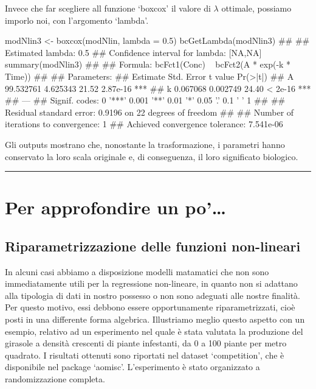 \documentclass[a4paper,12pt,oneside]{book}
\newenvironment{Shaded}{}{}
\newcommand{\KeywordTok}[1]{#1}
\newcommand{\DataTypeTok}[1]{#1}
\newcommand{\FloatTok}[1]{#1}
\newcommand{\StringTok}[1]{#1}
\newcommand{\CommentTok}[1]{#1}
\newcommand{\NormalTok}[1]{#1}
\begin{document}
Invece che far scegliere all funzione `boxcox' il valore di \(\lambda\) ottimale, possiamo imporlo noi, con l'argomento `lambda'.

\begin{Shaded}
\begin{Highlighting}[]
\NormalTok{modNlin3 <-}\StringTok{ }\KeywordTok{boxcox}\NormalTok{(modNlin, }\DataTypeTok{lambda =} \FloatTok{0.5}\NormalTok{)}
\KeywordTok{bcGetLambda}\NormalTok{(modNlin3)}
\CommentTok{## }
\CommentTok{## Estimated lambda: 0.5 }
\CommentTok{## Confidence interval for lambda: [NA,NA]}
\KeywordTok{summary}\NormalTok{(modNlin3)}
\CommentTok{## }
\CommentTok{## Formula: bcFct1(Conc) ~ bcFct2(A * exp(-k * Time))}
\CommentTok{## }
\CommentTok{## Parameters:}
\CommentTok{##    Estimate Std. Error t value Pr(>|t|)    }
\CommentTok{## A 99.532761   4.625343   21.52 2.87e-16 ***}
\CommentTok{## k  0.067068   0.002749   24.40  < 2e-16 ***}
\CommentTok{## ---}
\CommentTok{## Signif. codes:  0 '***' 0.001 '**' 0.01 '*' 0.05 '.' 0.1 ' ' 1}
\CommentTok{## }
\CommentTok{## Residual standard error: 0.9196 on 22 degrees of freedom}
\CommentTok{## }
\CommentTok{## Number of iterations to convergence: 1 }
\CommentTok{## Achieved convergence tolerance: 7.541e-06}
\end{Highlighting}
\end{Shaded}

Gli outputs mostrano che, nonostante la trasformazione, i parametri hanno conservato la loro scala originale e, di conseguenza, il loro significato biologico.

\begin{center}\rule{0.5\linewidth}{\linethickness}\end{center}

\hypertarget{per-approfondire-un-po-9}{%
\section{Per approfondire un po'\ldots{}}\label{per-approfondire-un-po-9}}

\hypertarget{riparametrizzazione-delle-funzioni-non-lineari}{%
\subsection{Riparametrizzazione delle funzioni non-lineari}\label{riparametrizzazione-delle-funzioni-non-lineari}}

In alcuni casi abbiamo a disposizione modelli matamatici che non sono immediatamente utili per la regressione non-lineare, in quanto non si adattano alla tipologia di dati in nostro possesso o non sono adeguati alle nostre finalità. Per questo motivo, essi debbono essere opportunamente riparametrizzati, cioè posti in una differente forma algebrica. Illustriamo meglio questo aspetto con un esempio, relativo ad un esperimento nel quale è stata valutata la produzione del girasole a densità crescenti di piante infestanti, da 0 a 100 piante per metro quadrato. I risultati ottenuti sono riportati nel dataset `competition', che è disponibile nel package `aomisc'. L'esperimento è stato organizzato a randomizzazione completa.
\end{document}
